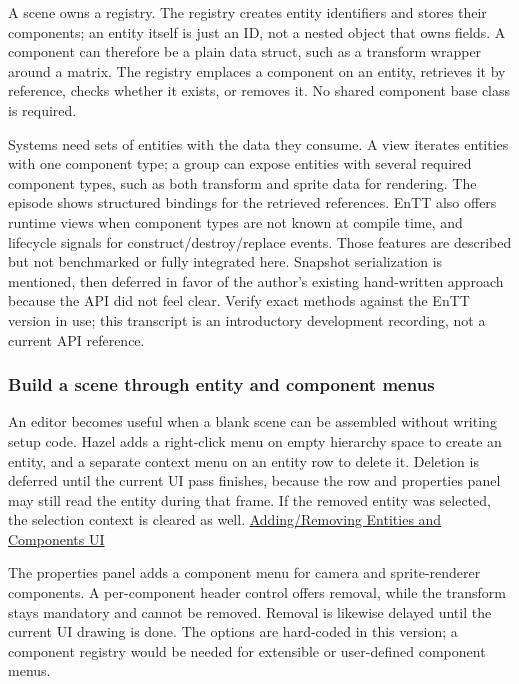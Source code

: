 A scene owns a registry. The registry creates entity identifiers and stores their components; an entity itself is just an ID, not a nested object that owns fields. A component can therefore be a plain data struct, such as a transform wrapper around a matrix. The registry emplaces a component on an entity, retrieves it by reference, checks whether it exists, or removes it. No shared component base class is required.

Systems need sets of entities with the data they consume. A view iterates entities with one component type; a group can expose entities with several required component types, such as both transform and sprite data for rendering. The episode shows structured bindings for the retrieved references. EnTT also offers runtime views when component types are not known at compile time, and lifecycle signals for construct/destroy/replace events. Those features are described but not benchmarked or fully integrated here. Snapshot serialization is mentioned, then deferred in favor of the author's existing hand-written approach because the API did not feel clear. Verify exact methods against the EnTT version in use; this transcript is an introductory development recording, not a current API reference.

\subsubsection{Build a scene through entity and component menus}\label{build-a-scene-through-entity-and-component-menus}

An editor becomes useful when a blank scene can be assembled without writing setup code. Hazel adds a right-click menu on empty hierarchy space to create an entity, and a separate context menu on an entity row to delete it. Deletion is deferred until the current UI pass finishes, because the row and properties panel may still read the entity during that frame. If the removed entity was selected, the selection context is cleared as well. \href{https://www.youtube.com/watch?v=PsyGmsIgp9M}{Adding/Removing Entities and Components UI}

The properties panel adds a component menu for camera and sprite-renderer components. A per-component header control offers removal, while the transform stays mandatory and cannot be removed. Removal is likewise delayed until the current UI drawing is done. The options are hard-coded in this version; a component registry would be needed for extensible or user-defined component menus.

